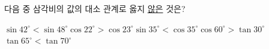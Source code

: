 다음 중 삼각비의 값의 대소 관계로 옳지 \underline{않은} 것은?
\begin{choicesii}{$\sin 42^\circ<\sin 48^\circ$}{$\cos 22^\circ>\cos 23^\circ$}{$\sin 35^\circ<\cos 35^\circ$}{$\cos 60^\circ>\tan 30^\circ$}{$\tan 65^\circ<\tan 70^\circ$}\end{choicesii}
